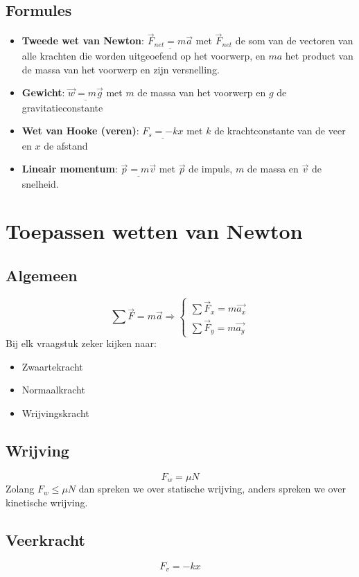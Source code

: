 \documentclass[12pt]{report}
\newcommand{\important}[1] {\textbf{\color{orange}#1}}
\begin{document}
\section{Formules}
\begin{itemize}
  \item {\important{Tweede wet van Newton}: 
  $\underline{\overrightarrow{F}_{net} = m\overrightarrow{a}}$ met $\overrightarrow{F}_{net}$ de som van de vectoren van alle krachten die worden uitgeoefend 
  op het voorwerp, en $ma$ het product van de massa van het voorwerp en zijn versnelling.}
  \item {\important{Gewicht}: $\underline{\overrightarrow{w} = m\overrightarrow{g}}$ met $m$ de massa van het voorwerp en $g$ de gravitatieconstante}
  \item {\important{Wet van Hooke (veren)}: $\underline{F_{s} = -kx}$ met $k$ de krachtconstante van de veer en $x$ de afstand}
  \item {\important{Lineair momentum}: 
  $\underline{\overrightarrow{p} = m\overrightarrow{v}}$ 
  met $\overrightarrow{p}$ de impuls, $m$ de massa en $\overrightarrow{v}$ de snelheid.
  }
\end{itemize}
\chapter{Toepassen wetten van Newton}
\section{Algemeen}
$$\sum \overrightarrow{F} = m\overrightarrow{a} \Rightarrow 
\begin{cases}
  \sum \overrightarrow{F}_x = m\overrightarrow{a_x} \\
  \sum \overrightarrow{F}_y = m\overrightarrow{a_y} 
 \end{cases}
$$
Bij elk vraagstuk zeker kijken naar:
\begin{itemize}
 \item Zwaartekracht
 \item Normaalkracht
 \item Wrijvingskracht
\end{itemize}


\section{Wrijving}
$$ F_{w} = \mu N$$
Zolang $F_w \leq \mu N$ dan spreken  we over statische wrijving, anders spreken we over kinetische wrijving.
\section{Veerkracht}
$$ F_v = -kx $$
\end{document}
